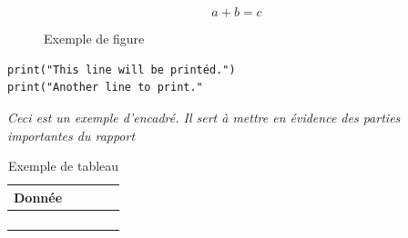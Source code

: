 \chapter{}
    \section{}
        \subsection{}
            \subsubsection{}
                \begin{equation}\label{eq:Eq1}
                    a+b = c
                \end{equation}
                \begin{figure}[htp]
                    \centering
                    {}
                    \caption{Exemple de figure}
                \end{figure}
                \begin{lstlisting}[caption={Un code Python}]
print("This line will be printéd.")
print("Another line to print."\end{lstlisting}
                \begin{tcolorbox}[colback=linkborder_Color!5!white,colframe=linkborder_Color!75!black]
                    \textit{Ceci est un exemple d'encadré. Il sert à mettre en évidence des parties importantes du rapport}
                \end{tcolorbox}
                \begin{table}[H]
                    \centering
                    \begin{tabular}{lcccc}
                        \toprule
                        \textbf{Donnée} & \textbf{} & \textbf{} & \textbf{} & \textbf{} \\
                        \midrule
                         &  &  &  &  \\
                         &  &  &  &  \\
                         &  &  &  &  \\
                         &  &  &  &  \\
                        \bottomrule
                    \end{tabular}
                    \caption{Exemple de tableau}
                \end{table}
